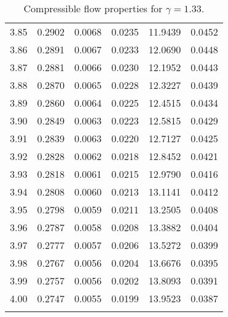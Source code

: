 \documentclass{article}
\begin{document}
\begin{longtable}{cccccc}
3.85 & 0.2902 & 0.0068 & 0.0235 & 11.9439 & 0.0452 \\
3.86 & 0.2891 & 0.0067 & 0.0233 & 12.0690 & 0.0448 \\
3.87 & 0.2881 & 0.0066 & 0.0230 & 12.1952 & 0.0443 \\
3.88 & 0.2870 & 0.0065 & 0.0228 & 12.3227 & 0.0439 \\
3.89 & 0.2860 & 0.0064 & 0.0225 & 12.4515 & 0.0434 \\
3.90 & 0.2849 & 0.0063 & 0.0223 & 12.5815 & 0.0429 \\
3.91 & 0.2839 & 0.0063 & 0.0220 & 12.7127 & 0.0425 \\
3.92 & 0.2828 & 0.0062 & 0.0218 & 12.8452 & 0.0421 \\
3.93 & 0.2818 & 0.0061 & 0.0215 & 12.9790 & 0.0416 \\
3.94 & 0.2808 & 0.0060 & 0.0213 & 13.1141 & 0.0412 \\
3.95 & 0.2798 & 0.0059 & 0.0211 & 13.2505 & 0.0408 \\
3.96 & 0.2787 & 0.0058 & 0.0208 & 13.3882 & 0.0404 \\
3.97 & 0.2777 & 0.0057 & 0.0206 & 13.5272 & 0.0399 \\
3.98 & 0.2767 & 0.0056 & 0.0204 & 13.6676 & 0.0395 \\
3.99 & 0.2757 & 0.0056 & 0.0202 & 13.8093 & 0.0391 \\
4.00 & 0.2747 & 0.0055 & 0.0199 & 13.9523 & 0.0387 \\
\bottomrule
\caption{Compressible flow properties for $\gamma = 1.33$.}
\end{longtable}
\end{document}
